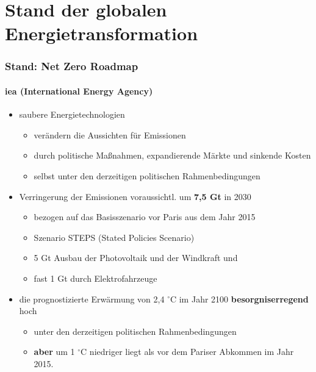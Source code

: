 \section{Stand der globalen Energietransformation}
	\begin{frame}
	\frametitle{Stand: Net Zero Roadmap}
	\framesubtitle{\hspace*{\fill}iea (International Energy Agency)\cite{iea_net_zero2023}}
	
	\begin{itemize}
	 \item saubere Energietechnologien 
		  \begin{itemize}
			  \item verändern die Aussichten für Emissionen 
		    \item durch politische Maßnahmen, expandierende Märkte und sinkende Kosten
				\item selbst unter den derzeitigen politischen Rahmenbedingungen
		\end{itemize}
		\pause
		\item Verringerung der  Emissionen  voraussichtl. um \textbf{7,5 Gt } in 2030    
			 \begin{itemize}
		   	 \item bezogen auf das  Basisszenario vor Paris aus dem Jahr 2015
			   \item Szenario STEPS (Stated Policies Scenario)  
				 \item 5 Gt  Ausbau der Photovoltaik und der Windkraft und 
				 \item fast 1 Gt durch  Elektrofahrzeuge 
			 \end{itemize}
			\pause
			\item  die prognostizierte Erwärmung von 2,4 $^\circ$C im Jahr 2100 \textbf<2->{besorgniserregend} hoch 
			\begin{itemize}
				\item unter den derzeitigen politischen Rahmenbedingungen 
				\item \textbf<2->{aber} um 1 $^\circ$C niedriger liegt als vor dem Pariser Abkommen im Jahr 2015.
     \end{itemize}
	\end{itemize}
		
	\end{frame}	
		

